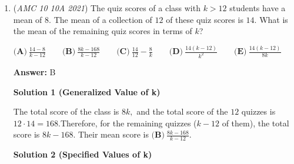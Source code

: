 \begin{enumerate}
 



\textbf{Solution 3 (Answer Choices and Modular Arithmetic)}

From the $30$-term sum 
 \[5+12+19+26+\cdots\] in Solution 1, taking modulo $10$ gives 
 \[5+12+19+26+\cdots \equiv 3\cdot(5+2+9+6+3+0+7+4+1+8) = 3\cdot45\equiv5 \pmod{10}.\] The only answer choices congruent to $5$ modulo $10$ are $\textbf{(A)}$ and $\textbf{(D)}.$ By a quick estimation, $\textbf{(A)}$ is too small, leaving us with $\boxed{\textbf{(D)} ~3195}.$




\textbf{Solution 4 (Motion With Constant Acceleration)}

This problem can be solved by physics method. This method is perhaps the quickest too and shows the beauty of the problem. The average speed increases $7 \ \text{in/s}$ per second. So, the acceleration $a=7 \ \text{in/s\textsuperscript{2}}.$ The average speed of the first second is $5 \ \text{in/s}.$ We can know the initial velocity $v_0=5-0.5\cdot7=1.5.$ (Because of the formula for the distance traveled in the $k$th one-second interval being $\Delta x_k = v_0 + a\left(k - \frac{1}{2}\right)$). The displacement at $t=30$ is 
 \[s=\frac{1}{2}at^2+v_0t=\frac{1}{2}\cdot7\cdot30^2+1.5\cdot30= \boxed{\textbf{(D)} ~3195}.\]~Bran\_Qin

 


	\item (\textit{AMC 10 10A 2021}) The quiz scores of a class with $k > 12$ students have a mean of $8$. The mean of a collection of $12$ of these quiz scores is $14$. What is the mean of the remaining quiz scores in terms of $k$?


 $\textbf{(A)} ~\frac{14-8}{k-12} \qquad\textbf{(B)} ~\frac{8k-168}{k-12} \qquad\textbf{(C)} ~\frac{14}{12} - \frac{8}{k} \qquad\textbf{(D)} ~\frac{14(k-12)}{k^2} \qquad\textbf{(E)} ~\frac{14(k-12)}{8k}$

 \textbf{Answer: }B



\textbf{Solution 1 (Generalized Value of k)}

The total score of the class is $8k,$ and the total score of the $12$ quizzes is $12\cdot14=168.$Therefore, for the remaining quizzes ($k-12$ of them), the total score is $8k-168.$ Their mean score is $\boxed{\textbf{(B)} ~\frac{8k-168}{k-12}}.$




\textbf{Solution 2 (Specified Values of k)}


\end{enumerate}
